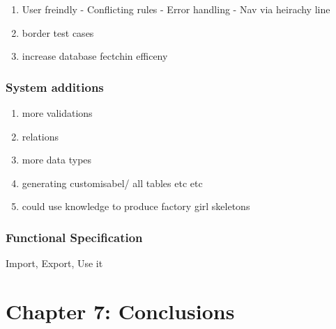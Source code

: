 \documentclass[a4paper,12pt]{article}
\begin{document}
\begin{enumerate}
\item User freindly - Conflicting rules - Error handling - Nav via heirachy line
\item border test cases
\item increase database fectchin efficeny
\end{enumerate}

\subsubsection{System additions}

\begin{enumerate}
\item more validations
\item relations
\item more data types
\item generating customisabel/ all tables etc etc
\item could use knowledge to produce factory girl skeletons
\end{enumerate}

\subsubsection{Functional Specification}
\par Import, Export, Use it

\section{Chapter 7: Conclusions}






\end{document}
